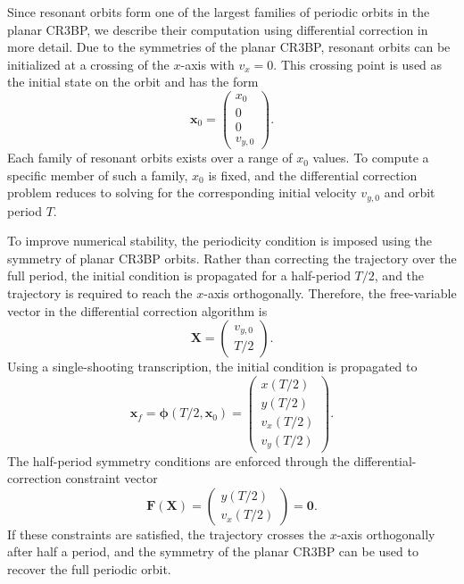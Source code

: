 Since resonant orbits form one of the largest families of periodic orbits in the planar CR3BP, we describe their computation using differential correction in more detail. 
Due to the symmetries of the planar CR3BP, resonant orbits can be initialized at a crossing of the $x$-axis with $v_x=0$. 
This crossing point is used as the initial state on the orbit and has the form
\begin{equation*}
    \boldsymbol{x}_0 =
    \begin{pmatrix}
        x_0 \\
        0 \\
        0 \\
        v_{y,0}
    \end{pmatrix}.
\end{equation*}
Each family of resonant orbits exists over a range of $x_0$ values. 
To compute a specific member of such a family, $x_0$ is fixed, and the differential correction problem reduces to solving for the corresponding initial velocity $v_{y,0}$ and orbit period $T$.

To improve numerical stability, the periodicity condition is imposed using the symmetry of planar CR3BP orbits. 
Rather than correcting the trajectory over the full period, the initial condition is propagated for a half-period $T/2$, and the trajectory is required to reach the $x$-axis orthogonally. 
Therefore, the free-variable vector in the differential correction algorithm is
\begin{equation*}
    \boldsymbol{X}
    =
    \begin{pmatrix}
        v_{y,0} \\
        T/2
    \end{pmatrix}.
\end{equation*}
Using a single-shooting transcription, the initial condition is propagated to
\begin{equation*}
    \boldsymbol{x}_f
    =
    \boldsymbol{\phi}(T/2,\boldsymbol{x}_0)
    =
    \begin{pmatrix}
        x(T/2) \\
        y(T/2) \\
        v_x(T/2) \\
        v_y(T/2)
    \end{pmatrix}.
\end{equation*}
The half-period symmetry conditions are enforced through the differential-correction constraint vector
\begin{equation*}
    \boldsymbol{F}(\boldsymbol{X})
    =
    \begin{pmatrix}
        y(T/2) \\
        v_x(T/2)
    \end{pmatrix}
    =
    \boldsymbol{0}.
\end{equation*}
If these constraints are satisfied, the trajectory crosses the $x$-axis orthogonally after half a period, and the symmetry of the planar CR3BP can be used to recover the full periodic orbit.

